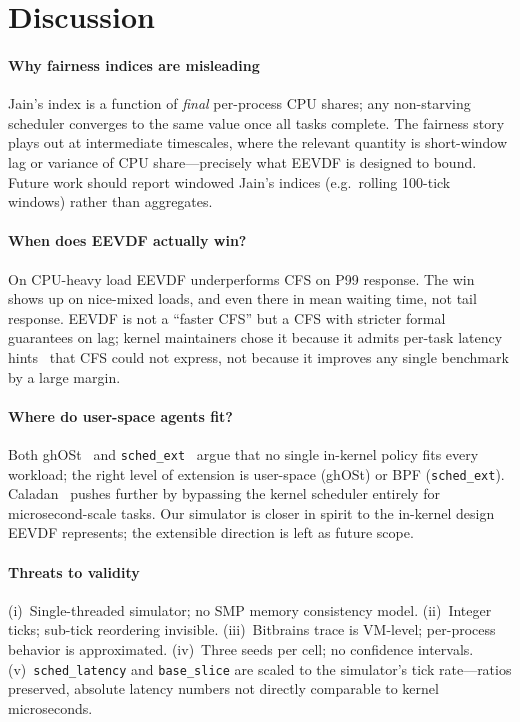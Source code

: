 \documentclass[conference]{IEEEtran}
\begin{document}
\section{Discussion}
\label{sec:discussion}

\paragraph{Why fairness indices are misleading}
Jain's index is a function of \emph{final} per-process CPU shares;
any non-starving scheduler converges to the same value once all
tasks complete. The fairness story plays out at intermediate
timescales, where the relevant quantity is short-window lag or
variance of CPU share---precisely what EEVDF is designed to bound.
Future work should report windowed Jain's indices (e.g.\ rolling
100-tick windows) rather than aggregates.

\paragraph{When does EEVDF actually win?}
On CPU-heavy load EEVDF underperforms CFS on P99 response. The win
shows up on nice-mixed loads, and even there in mean waiting time,
not tail response. EEVDF is not a ``faster CFS'' but a CFS with
stricter formal guarantees on lag; kernel maintainers chose it
because it admits per-task latency
hints~\cite{zijlstra_eevdf_latency_2023} that CFS could not express,
not because it improves any single benchmark by a large margin.

\paragraph{Where do user-space agents fit?}
Both ghOSt~\cite{humphries2021ghost} and
\texttt{sched\_ext}~\cite{linux_schedext_doc_2024} argue that no
single in-kernel policy fits every workload; the right level of
extension is user-space (ghOSt) or BPF (\texttt{sched\_ext}).
Caladan~\cite{fried2020caladan} pushes further by bypassing the
kernel scheduler entirely for microsecond-scale tasks. Our simulator
is closer in spirit to the in-kernel design EEVDF represents; the
extensible direction is left as future scope.

\paragraph{Threats to validity}
(i)~Single-threaded simulator; no SMP memory consistency model.
(ii)~Integer ticks; sub-tick reordering invisible. (iii)~Bitbrains
trace is VM-level; per-process behavior is approximated.
(iv)~Three seeds per cell; no confidence intervals.
(v)~\texttt{sched\_latency} and \texttt{base\_slice} are scaled to
the simulator's tick rate---ratios preserved, absolute latency
numbers not directly comparable to kernel microseconds.
\end{document}
